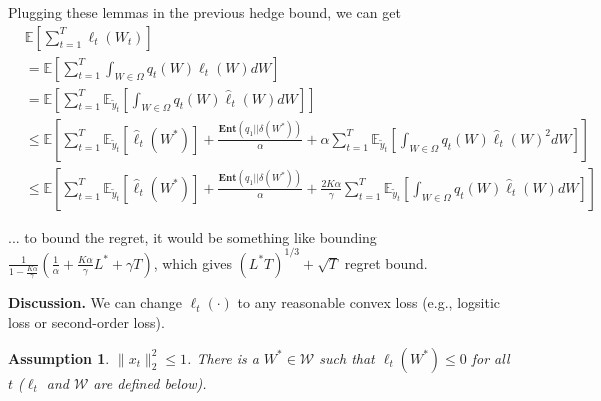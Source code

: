 \documentclass{article}
\newcommand{\field}[1]{\mathbb{#1}}
\newcommand{\E}{\field{E}}
\newtheorem{assumption}{Assumption}
\newtheorem{lemma}[theorem]{Lemma}
\begin{document}

Plugging these lemmas in the previous hedge bound, we can get \begin{align*}
&\E\left[\sum_{t=1}^T  \ell_{t}(W_{t})  \right]\\
&=\E\left[\sum_{t=1}^T  \int_{W\in\Omega} q_t(W)\ell_t(W)dW  \right] \\
&=\E\left[\sum_{t=1}^T \E_{\tilde{y}_t} \left[ \int_{W\in\Omega} q_t(W)\hat{\ell}_t(W)dW \right] \right]\\
&\leq \E\left[\sum_{t=1}^T \E_{\tilde{y}_t} \left[ \hat{\ell}_t(W^*) \right]+ \frac{\textbf{Ent}(q_1||\delta(W^*))}{\alpha} + \alpha \sum_{t=1}^T \E_{\tilde{y}_t}\left[ \int_{W\in\Omega} q_t(W)\hat{\ell}_t(W)^2dW \right] \right] \\ 
&\leq \E\left[\sum_{t=1}^T \E_{\tilde{y}_t}\left[ \hat{\ell}_t(W^*) \right] + \frac{\textbf{Ent}(q_1||\delta(W^*))}{\alpha} + \frac{2K\alpha}{\gamma} \sum_{t=1}^T \E_{\tilde{y}_t}\left[ \int_{W\in\Omega} q_t(W)\hat{\ell}_t(W)dW \right]\right]
\end{align*}

... to bound the regret, it would be something like bounding $\frac{1}{1-\frac{K\alpha}{\gamma}}\left(\frac{1}{\alpha}+\frac{K\alpha}{\gamma}L^* + \gamma T\right)$, which gives $(L^*T)^{1/3} + \sqrt{T}$ regret bound. 


\textbf{Discussion.} We can change $\ell_t(\cdot)$ to any reasonable convex loss (e.g., logsitic loss or second-order loss). 
\fi

\begin{assumption}
$\|x_t\|_2^2\leq 1$. There is a $W^*\in\mathcal{W}$ such that $\ell_t(W^*)\leq 0$ for all $t$ ($\ell_t$ and $\mathcal{W}$ are defined below).  
\end{assumption}
\end{document}
